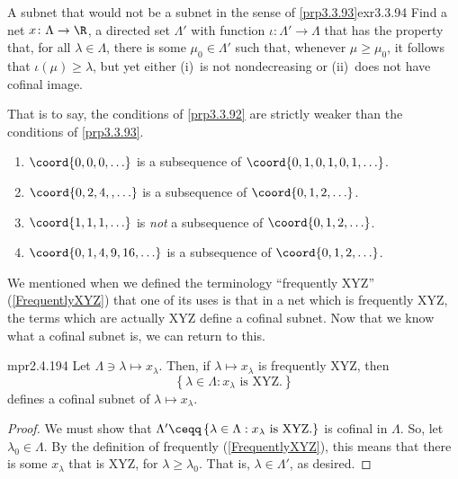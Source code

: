 \begin{exr}{A subnet that would not be a subnet in the sense of \cref{prp3.3.93}}{exr3.3.94}
Find a net $x\colon \Lambda \rightarrow \R$, a directed set $\Lambda '$ with function $\iota :\Lambda '\rightarrow \Lambda$ that has the property that, for all $\lambda \in \Lambda$, there is some $\mu _0\in \Lambda '$ such that, whenever $\mu \geq \mu_0$, it follows that $\iota (\mu )\geq \lambda$, but yet either (i)~is not nondecreasing or (ii)~does not have cofinal image.
\begin{rmk}
That is to say, the conditions of \cref{prp3.3.92} are strictly weaker than the conditions of \cref{prp3.3.93}.
\end{rmk}
\end{exr}

\begin{exm}{}{}
\begin{enumerate}
\item $\coord{0,0,0,\ldots}$ is a subsequence of $\coord{0,1,0,1,0,1,\ldots}$.
\item $\coord{0,2,4,,\ldots}$ is a subsequence of $\coord{0,1,2,\ldots}$.
\item $\coord{1,1,1,\ldots}$ is \emph{not} a subsequence of $\coord{0,1,2,\ldots}$.
\item $\coord{0,1,4,9,16,\ldots}$ is a subsequence of $\coord{0,1,2,\ldots}$.
\end{enumerate}
\end{exm}

We mentioned when we defined the terminology ``frequently XYZ'' (\cref{FrequentlyXYZ}) that one of its uses is that in a net which is frequently XYZ, the terms which are actually XYZ define a cofinal subnet.  Now that we know what a cofinal subnet is, we can return to this.
\begin{mpr}{}{mpr2.4.194}
Let $\Lambda \ni \lambda \mapsto x_{\lambda}$.  Then, if $\lambda \mapsto x_{\lambda}$ is frequently XYZ, then
\begin{equation}
\left\{ \lambda \in \Lambda :x_{\lambda}\text{ is XYZ.}\right\}
\end{equation}
defines a cofinal subnet of $\lambda \mapsto x_{\lambda}$.
\begin{proof}
We must show that $\Lambda '\ceqq \left\{ \lambda \in \Lambda :x_{\lambda}\text{ is XYZ.}\right\}$ is cofinal in $\Lambda$.  So, let $\lambda _0\in \Lambda$.  By the definition of frequently (\cref{FrequentlyXYZ}), this means that there is some $x_{\lambda}$ that is XYZ, for $\lambda \geq \lambda _0$.  That is, $\lambda \in \Lambda '$, as desired.
\end{proof}
\end{mpr}

